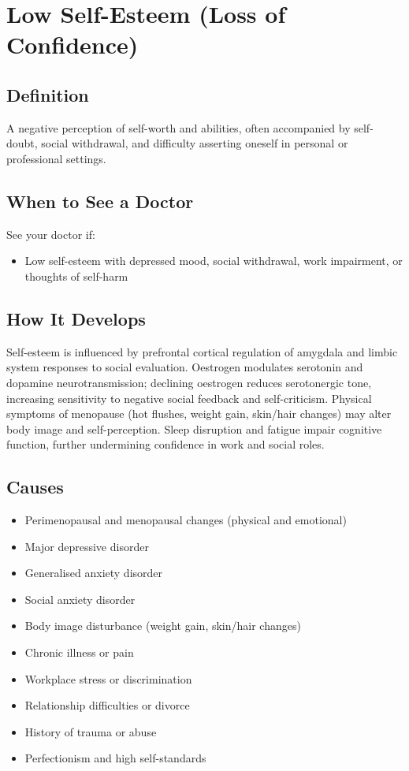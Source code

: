 \chapter{Low Self-Esteem (Loss of Confidence)}

\section*{Definition}
A negative perception of self-worth and abilities, often accompanied by self-doubt, social withdrawal, and difficulty asserting oneself in personal or professional settings.

\section*{When to See a Doctor}
See your doctor if:
\begin{itemize}
  \item Low self-esteem with depressed mood, social withdrawal, work impairment, or thoughts of self-harm
\end{itemize}

\section*{How It Develops}
Self-esteem is influenced by prefrontal cortical regulation of amygdala and limbic system responses to social evaluation. Oestrogen modulates serotonin and dopamine neurotransmission; declining oestrogen reduces serotonergic tone, increasing sensitivity to negative social feedback and self-criticism. Physical symptoms of menopause (hot flushes, weight gain, skin/hair changes) may alter body image and self-perception. Sleep disruption and fatigue impair cognitive function, further undermining confidence in work and social roles.

\section*{Causes}
\begin{itemize}
  \item Perimenopausal and menopausal changes (physical and emotional)
  \item Major depressive disorder
  \item Generalised anxiety disorder
  \item Social anxiety disorder
  \item Body image disturbance (weight gain, skin/hair changes)
  \item Chronic illness or pain
  \item Workplace stress or discrimination
  \item Relationship difficulties or divorce
  \item History of trauma or abuse
  \item Perfectionism and high self-standards
\end{itemize}

